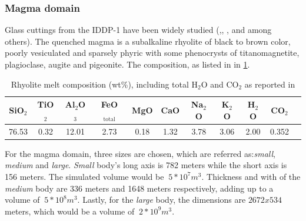 \subsubsection{Magma domain}
Glass cuttings from the IDDP-1 have been widely studied (\cite{elders2010},\cite{elders2011}, \cite{zierenberg2013}, \cite{masotta2018} and \cite{saubin2021} among others). The quenched magma is a subalkaline rhyolite of black to brown color, poorly vesiculated and sparsely phyric with some phenocrysts of titanomagnetite, plagioclase, augite and pigeonite. The composition, as listed in \cite{elders2014} in \ref{tab:rhyolite_composition}.
\begin{table}
	\begin{tabular}{|c|c|c|c|c|c|c|c|c|c|c|}
		\hline
		SiO$_2$ & TiO$_2$ & Al$_2$O$_3$ & FeO$_\text{total}$ & MgO & CaO & Na$_2$O & K$_2$O & H$_2$O & CO$_2$ \\
		\hline
		76.53 & 0.32 & 12.01 & 2.73 & 0.18 & 1.32 & 3.78 & 3.06 & 2.00 & 0.352 \\
		\hline
	\end{tabular}
	\caption{Rhyolite melt composition (wt\%), including total H$_2$O and CO$_2$ as reported in \cite{elders2014}}
	\label{tab:rhyolite_composition}
\end{table}

For the magma domain, three sizes are chosen, which are referred as:\textit{small}, \textit{medium} and \textit{large}.
\textit{Small} body's long axis is 782 meters while the short axis is 156 meters. The simulated volume would be $~5*10^7 m^3$. 
Thickness and with of the \textit{medium} body are 336 meters and 1648 meters respectively, adding up to a volume of $~5*10^8 m^3$. 
Lastly, for the \textit{large} body, the dimensions are $2672x534$ meters, which would be a volume of $~2*10^9 m^3$. 

